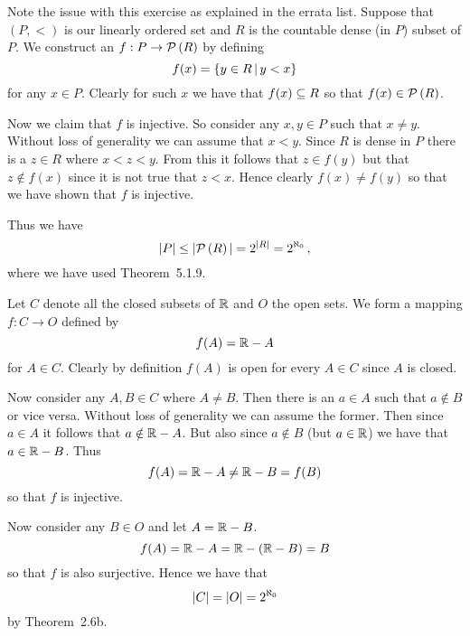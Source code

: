 
\begin{solution}
	Note the issue with this exercise as explained in the errata list.
    Suppose that $(P,<)$ is our linearly ordered set and $R$ is the countable dense (in $P$) subset of $P$.
    We construct an $f : P \to \pset{R}$ by defining
    $$
    f(x) = \braces{y \in R \where y < x}
    $$
    for any $x \in P$.
    Clearly for such $x$ we have that $f(x) \ss R$ so that $f(x) \in \pset{R}$.

    Now we claim that $f$ is injective.
    So consider any $x,y \in P$ such that $x \neq y$.
    Without loss of generality we can assume that $x < y$.
    Since $R$ is dense in $P$ there is a $z \in R$ where $x < z < y$.
    From this it follows that $z \in f(y)$ but that $z \notin f(x)$ since it is not true that $z < x$.
    Hence clearly $f(x) \neq f(y)$ so that we have shown that $f$ is injective.

    Thus we have
    $$
    |P| \leq |\pset{R}| = 2^{|R|} = 2^\N \,,
    $$
    where we have  used Theorem~5.1.9. \qedsymbol
\end{solution}


\begin{solution}
	Let $C$ denote all the closed subsets of $\reals$ and $O$ the open sets.
    We form a mapping $f: C \to O$ defined by
    $$
    f(A) = \reals - A
    $$
    for $A \in C$.
    Clearly by definition $f(A)$ is open for every $A \in C$ since $A$ is closed.

    Now consider any $A,B \in C$ where $A \neq B$.
    Then there is an $a \in A$ such that $a \notin B$ or vice versa.
    Without loss of generality we can assume the former.
    Then since $a \in A$ it follows that $a \notin \reals - A$.
    But also since $a \notin B$ (but $a \in \reals$) we have that $a \in \reals - B$.
    Thus
    $$
    f(A) = \reals - A \neq \reals - B = f(B)
    $$
    so that $f$ is injective.

    Now consider any $B \in O$ and let $A = \reals - B$.
    $$
    f(A) = \reals - A = \reals - (\reals - B) = B
    $$
    so that $f$ is also surjective.
    Hence we have that
    $$
    |C| = |O| = \NI
    $$
    by Theorem~2.6b. \qedsymbol
\end{solution}


